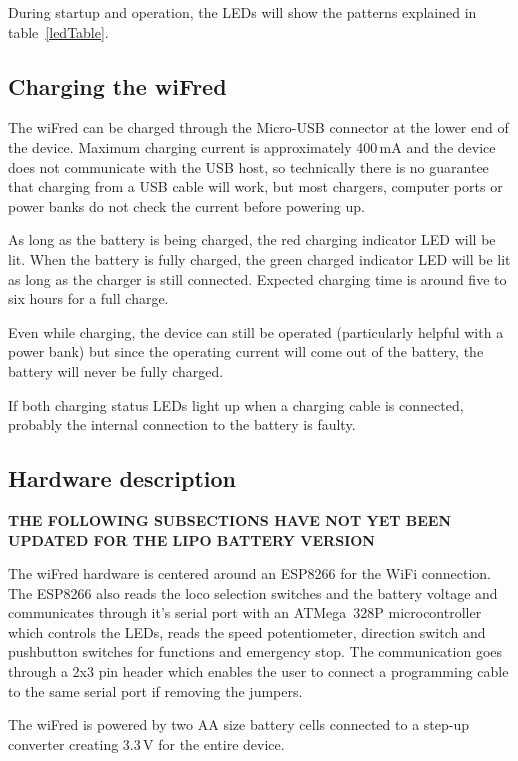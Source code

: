\documentclass[11pt,a4paper]{scrartcl}
\begin{document}
During startup and operation, the LEDs will show the patterns explained in table~\ref{ledTable}.

\subsection{Charging the wiFred}

The wiFred can be charged through the Micro-USB connector at the lower end of the device. Maximum charging current is approximately 400\,mA and the device does not communicate with the USB host, so technically there is no guarantee that charging from a USB cable will work, but most chargers, computer ports or power banks do not check the current before powering up.

As long as the battery is being charged, the red charging indicator LED will be lit. When the battery is fully charged, the green charged indicator LED will be lit as long as the charger is still connected. Expected charging time is around five to six hours for a full charge.

Even while charging, the device can still be operated (particularly helpful with a power bank) but since the operating current will come out of the battery, the battery will never be fully charged.

If both charging status LEDs light up when a charging cable is connected, probably the internal connection to the battery is faulty.

\subsection{Hardware description}


\textbf{THE FOLLOWING SUBSECTIONS HAVE NOT YET BEEN UPDATED FOR THE LIPO BATTERY VERSION}

The wiFred hardware is centered around an ESP8266 for the WiFi connection. The ESP8266 also reads the loco selection switches and the battery voltage and communicates through it's serial port with an ATMega~328P microcontroller which controls the LEDs, reads the speed potentiometer, direction switch and pushbutton switches for functions and emergency stop. The communication goes through a 2x3 pin header which enables the user to connect a programming cable to the same serial port if removing the jumpers.

The wiFred is powered by two AA size battery cells connected to a step-up converter creating 3.3\,V for the entire device.
\end{document}
